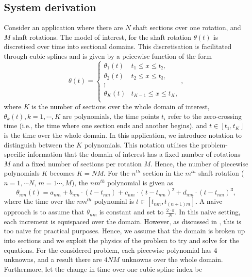\documentclass{article}
\begin{document}
	\subsection{System derivation}
	Consider an application where there are $N$ shaft sections over one rotation, and $M$ shaft rotations. The model of interest, for the shaft rotation $\theta(t)$ is discretised over time into sectional domains. This discretisation is facilitated through cubic splines \cite{Diamond2016} and is given by a peicewise function of the form
	\begin{equation}
		\theta(t) = \begin{cases} 
			\theta_{1}(t) &  t_{1} \leq x \leq t_2, \\
			\theta_{2}(t) &  t_{2} \leq x \leq t_3, \\
			\vdots \\
			\theta_{K}(t) &  t_{K-1} \leq x \leq t_K, \\
		\end{cases},
	\end{equation}
	where $K$ is the number of sections over the whole domain of interest, $\theta_{k}(t), k = 1, \cdots, K$ are polynomials, the time points $t_i$ refer to the zero-crossing time (i.e., the time where one section ends and another begins), and $t \in [t_1, t_K]$ is the time over the whole domain. In this application, we introduce notation to distinguish between the $K$ polynomials. This notation utilises the problem-specific information that the domain of interest has a fixed number of rotations $M$ and a fixed number of sections per rotation $M$. Hence, the number of piecewise polynomials $K$ becomes $K = NM$. For the $n^{th}$ section in the $m^{th}$ shaft rotation ($n = 1, \cdots N$, $m = 1 \cdots, M$), the $nm^{th}$ polynomial is given as
	\begin{equation}
		\theta_{nm}(t) = a_{nm} + b_{nm} \cdot \left(t - t_{nm} \right) + c_{nm} \cdot \left(t - t_{nm} \right)^2 + d_{nm} \cdot \left( t - t_{nm}\right)^3,
	\end{equation}
	where the time over the $nm^{th}$ polynomial is $t \in [t_{nm}, t_{(n + 1)m}]$. A naive approach is to assume that $\theta_{nm}$ is constant and set to $\frac{2\cdot\pi}{N}$. In this naive setting, each increment is equispaced over the domain. However, as discussed in \cite{Diamond2016}, this is too naive for practical purposes. Hence, we assume that the domain is broken up into sections and we exploit the physics of the problem to try and solve for the equations. For the considered problem, each piecewise polynomial has $4$ unknowns, and a result there are $4NM$ unknowns over the whole domain. Furthermore, let the change in time over one cubic spline index be
\end{document}
